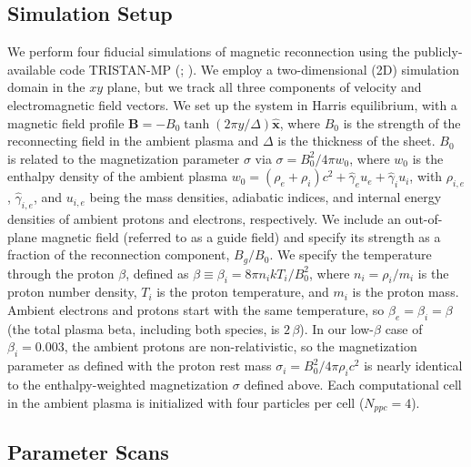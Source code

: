 \documentclass[iop,twocolappendix]{emulateapj}
\begin{document}
\subsection{Simulation Setup} \label{sim_details}
We perform four fiducial simulations of magnetic reconnection using the publicly-available code TRISTAN-MP (\citealt{buneman93}; \citealt{spitkovsky05}).  We employ a two-dimensional (2D) simulation domain in the $xy$ plane, but we track all three components of velocity and electromagnetic field vectors.  We set up the system in Harris equilibrium, with a magnetic field profile $\bm{{B}} = -B_{0}\tanh{\left(2\pi y / \Delta\right)}\bm{\hat{x}}$, where $B_{0}$ is the strength of the reconnecting field in the ambient plasma and $\Delta$ is the thickness of the sheet.  $B_{0}$ is related to the magnetization parameter $\sigma$ via $\sigma=B_{0}^2 / 4\pi w_{0} $, where $w_{0}$ is the enthalpy density of the ambient plasma $w_0=(\rho_{e}+\rho_{i})c^{2}+ \hat{\gamma}_{e}u_{e}+ \hat{\gamma}_{i}u_{i}$, with $\rho_{i,e}$, $\hat{\gamma}_{i,e}$, and $u_{i,e}$ being the mass densities, adiabatic indices, and internal energy densities of ambient protons and electrons, respectively.  We include an out-of-plane magnetic field (referred to as a guide field) and specify its strength as a fraction of the reconnection component, $B_{g}/B_{0}$.  We specify the temperature through the proton $\beta$, defined as $\beta \equiv \beta_{i}=8 \pi n_{i} k T_{i}/B_{0}^{2}$, where $n_i=\rho_i/m_i$ is the proton number density, $T_i$ is the proton temperature, and $m_i$ is the proton mass. Ambient electrons and protons start with the same temperature, so $\beta_e=\beta_i=\beta$ (the total plasma beta, including both species, is $2\,\beta$). In our low-$\beta$ case of $\beta_{i}=0.003$, the ambient protons are non-relativistic, so the magnetization parameter as defined with the proton rest mass $\sigma_i=B_0^2/4\pi \rho_i c^2$ is nearly identical to the enthalpy-weighted magnetization $\sigma$ defined above. Each computational cell in the ambient plasma is initialized with four particles per cell ($N_{ppc}=4$). 

\subsection{Parameter Scans}
\end{document}
